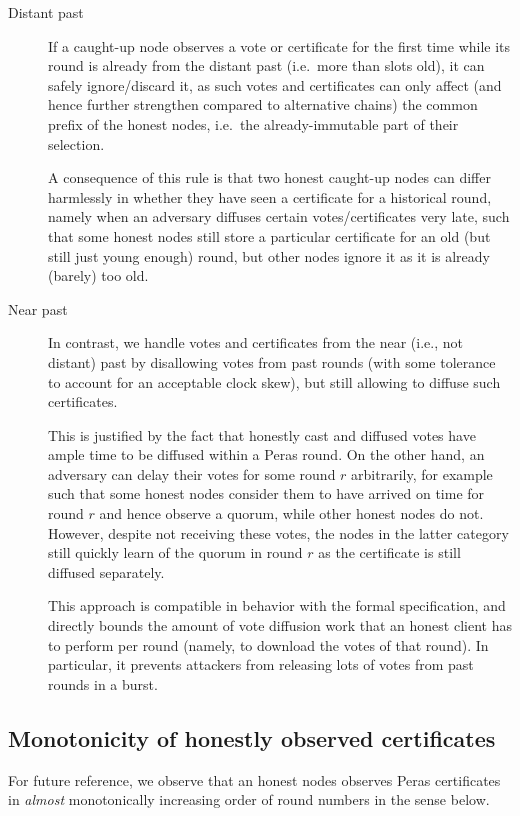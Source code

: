 \begin{description}
\item[Distant past]
  If a caught-up node observes a vote or certificate for the first time while its round is already from the distant past (i.e.\ more than \Tcp{} slots old), it can safely ignore/discard it, as such votes and certificates can only affect (and hence further strengthen compared to alternative chains) the common prefix of the honest nodes, i.e.\ the already-immutable part of their selection.

  A consequence of this rule is that two honest caught-up nodes can differ harmlessly in whether they have seen a certificate for a historical round, namely when an adversary diffuses certain votes/certificates very late, such that some honest nodes still store a particular certificate for an old (but still just young enough) round, but other nodes ignore it as it is already (barely) too old.
\item[Near past]
  In contrast, we handle votes and certificates from the near (i.e., not distant) past by disallowing votes from past rounds (with some tolerance to account for an acceptable clock skew), but still allowing to diffuse such certificates.

  This is justified by the fact that honestly cast and diffused votes have ample time to be diffused within a Peras round.
  On the other hand, an adversary can delay their votes for some round $r$ arbitrarily, for example such that some honest nodes consider them to have arrived on time for round $r$ and hence observe a quorum, while other honest nodes do not.
  However, despite not receiving these votes, the nodes in the latter category still quickly learn of the quorum in round $r$ as the certificate is still diffused separately.

  This approach is compatible in behavior with the formal specification, and directly bounds the amount of vote diffusion work that an honest client has to perform per round (namely, to download the votes of that round).
  In particular, it prevents attackers from releasing lots of votes from past rounds in a burst.
\end{description}

\subsection{Monotonicity of honestly observed certificates}\label{sec:cert monotonicity}
For future reference, we observe that an honest nodes observes Peras certificates in \emph{almost} monotonically increasing order of round numbers in the sense below.

